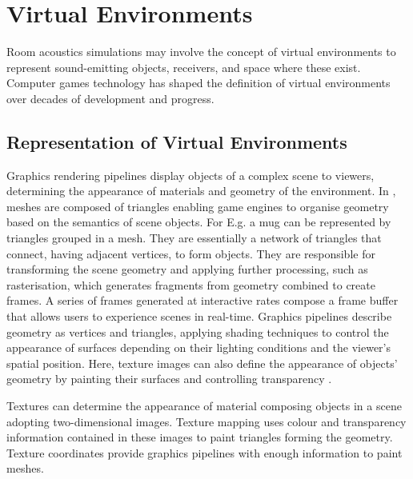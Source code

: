 \section{Virtual Environments}
Room acoustics simulations may involve the concept of virtual environments to represent sound-emitting objects, receivers, and space where these exist. Computer games technology has shaped the definition of virtual environments over decades of development and progress.

\subsection{Representation of Virtual Environments}
Graphics rendering pipelines display objects of a complex scene to viewers, determining the appearance of materials and geometry of the environment. In , meshes are composed of triangles enabling game engines to organise geometry based on the semantics of scene objects. For E.g. a mug can be represented by triangles grouped in a mesh. They are essentially a network of triangles that connect, having adjacent vertices, to form objects. They are responsible for transforming the scene geometry and applying further processing, such as rasterisation, which generates fragments from geometry combined to create frames. A series of frames generated at interactive rates compose a frame buffer that allows users to experience scenes in real-time. Graphics pipelines describe geometry as vertices and triangles, applying shading techniques to control the appearance of surfaces depending on their lighting conditions and the viewer’s spatial position. Here, texture images can also define the appearance of objects' geometry by painting their surfaces and controlling transparency \citep{mcallister2002efficient, marschner2015fundamentals}.\par
Textures can determine the appearance of material composing objects in a scene adopting two-dimensional images. Texture mapping uses colour and transparency information contained in these images to paint triangles forming the geometry. Texture coordinates provide graphics pipelines with enough information to paint meshes.

